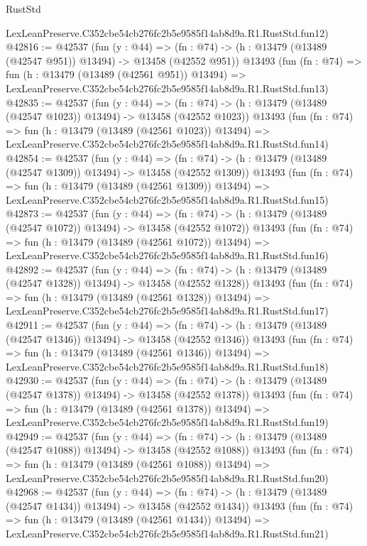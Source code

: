 \begin{lexlean}{RustStd}
\begin{coremodule}
    LexLeanPreserve.C352cbe54cb276fc2b5e9585f14ab8d9a.R1.RustStd.fun12)
@42816 := @42537
    (fun (y : @44) =>
    (fn : @74) -> (h : @13479 (@13489 (@42547 @951)) @13494) -> @13458 (@42552 @951))
    @13493
    (fun (fn : @74) =>
    fun (h : @13479 (@13489 (@42561 @951)) @13494) =>
    LexLeanPreserve.C352cbe54cb276fc2b5e9585f14ab8d9a.R1.RustStd.fun13)
@42835 := @42537
    (fun (y : @44) =>
    (fn : @74) -> (h : @13479 (@13489 (@42547 @1023)) @13494) -> @13458 (@42552 @1023))
    @13493
    (fun (fn : @74) =>
    fun (h : @13479 (@13489 (@42561 @1023)) @13494) =>
    LexLeanPreserve.C352cbe54cb276fc2b5e9585f14ab8d9a.R1.RustStd.fun14)
@42854 := @42537
    (fun (y : @44) =>
    (fn : @74) -> (h : @13479 (@13489 (@42547 @1309)) @13494) -> @13458 (@42552 @1309))
    @13493
    (fun (fn : @74) =>
    fun (h : @13479 (@13489 (@42561 @1309)) @13494) =>
    LexLeanPreserve.C352cbe54cb276fc2b5e9585f14ab8d9a.R1.RustStd.fun15)
@42873 := @42537
    (fun (y : @44) =>
    (fn : @74) -> (h : @13479 (@13489 (@42547 @1072)) @13494) -> @13458 (@42552 @1072))
    @13493
    (fun (fn : @74) =>
    fun (h : @13479 (@13489 (@42561 @1072)) @13494) =>
    LexLeanPreserve.C352cbe54cb276fc2b5e9585f14ab8d9a.R1.RustStd.fun16)
@42892 := @42537
    (fun (y : @44) =>
    (fn : @74) -> (h : @13479 (@13489 (@42547 @1328)) @13494) -> @13458 (@42552 @1328))
    @13493
    (fun (fn : @74) =>
    fun (h : @13479 (@13489 (@42561 @1328)) @13494) =>
    LexLeanPreserve.C352cbe54cb276fc2b5e9585f14ab8d9a.R1.RustStd.fun17)
@42911 := @42537
    (fun (y : @44) =>
    (fn : @74) -> (h : @13479 (@13489 (@42547 @1346)) @13494) -> @13458 (@42552 @1346))
    @13493
    (fun (fn : @74) =>
    fun (h : @13479 (@13489 (@42561 @1346)) @13494) =>
    LexLeanPreserve.C352cbe54cb276fc2b5e9585f14ab8d9a.R1.RustStd.fun18)
@42930 := @42537
    (fun (y : @44) =>
    (fn : @74) -> (h : @13479 (@13489 (@42547 @1378)) @13494) -> @13458 (@42552 @1378))
    @13493
    (fun (fn : @74) =>
    fun (h : @13479 (@13489 (@42561 @1378)) @13494) =>
    LexLeanPreserve.C352cbe54cb276fc2b5e9585f14ab8d9a.R1.RustStd.fun19)
@42949 := @42537
    (fun (y : @44) =>
    (fn : @74) -> (h : @13479 (@13489 (@42547 @1088)) @13494) -> @13458 (@42552 @1088))
    @13493
    (fun (fn : @74) =>
    fun (h : @13479 (@13489 (@42561 @1088)) @13494) =>
    LexLeanPreserve.C352cbe54cb276fc2b5e9585f14ab8d9a.R1.RustStd.fun20)
@42968 := @42537
    (fun (y : @44) =>
    (fn : @74) -> (h : @13479 (@13489 (@42547 @1434)) @13494) -> @13458 (@42552 @1434))
    @13493
    (fun (fn : @74) =>
    fun (h : @13479 (@13489 (@42561 @1434)) @13494) =>
    LexLeanPreserve.C352cbe54cb276fc2b5e9585f14ab8d9a.R1.RustStd.fun21)

\end{coremodule}
\end{lexlean}
